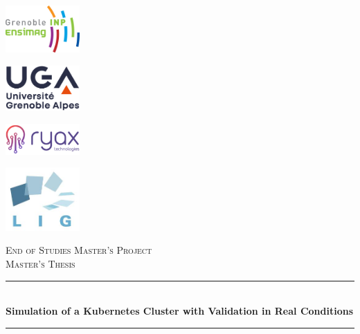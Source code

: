\documentclass[12pt]{report}
\begin{document}
\begin{titlepage}
    \newcommand{\HRule}{\rule{\linewidth}{0.5mm}} %

    \centering
    \begin{minipage}{.25\textwidth}
	    \centering
	    \includegraphics[width=80pt]{../imgs/ENSIMAG.png}\\[1cm]
    \end{minipage}%
    \begin{minipage}{.25\textwidth}
	    \centering
	    \includegraphics[width=80pt]{../imgs/uga-logo.png}\\[1cm]
    \end{minipage}%
    \begin{minipage}{.25\textwidth}
	    \centering
	    \includegraphics[width=80pt]{../imgs/ryax-logo.png}\\[1cm]
    \end{minipage}%
    \begin{minipage}{.25\textwidth}
	    \centering
	    \includegraphics[width=80pt]{../imgs/logo-LIG.jpg}\\[1cm]
    \end{minipage}

    \vspace{4cm}
    \textsc{\Large End of Studies Master's Project}\\[0.5cm]
    \textsc{\large Master's Thesis}\\[0.5cm]

    \HRule \\[0.4cm]
    { \huge \bfseries Simulation of a Kubernetes Cluster with Validation in Real Conditions}\\[0.4cm]
    \HRule \\[3cm]


\end{titlepage}
\end{document}
